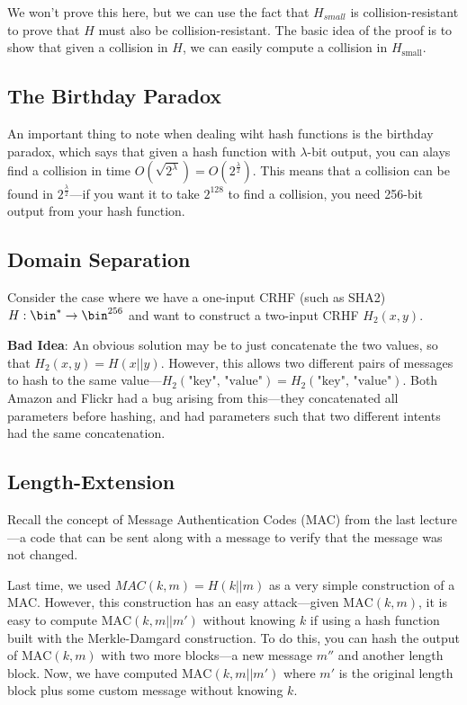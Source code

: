 We won't prove this here, but we can use the fact that $H_{small}$ is collision-resistant to prove that $H$ must also be collision-resistant. The basic idea of the proof is to show that given a collision in $H$, we can easily compute a collision in $H_{\text{small}}$. 

\subsection{The Birthday Paradox}
An important thing to note when dealing wiht hash functions is the birthday paradox, which says that given a hash function with $\lambda$-bit output, you can alays find a collision in time $O(\sqrt{2^\lambda}) = O(2^{\frac{\lambda}{2}})$. This means that a collision can be found in $2^\frac{\lambda}{2}$---if you want it to take $2^128$ to find a collision, you need 256-bit output from your hash function.

\subsection{Domain Separation}
Consider the case where we have a one-input CRHF (such as SHA2) $H: \bin^* \rightarrow \bin^{256}$ and want to construct a two-input CRHF $H_2(x, y)$. 

\textbf{Bad Idea}: An obvious solution may be to just concatenate the two values, so that $H_2(x, y) = H(x || y)$. However, this allows two different pairs of messages to hash to the same value---$H_2(\text{"key", "value"}) = H_2(\text{"key", "value"})$. Both Amazon and Flickr had a bug arising from this---they concatenated all parameters before hashing, and had parameters such that two different intents had the same concatenation.

\subsection{Length-Extension}
Recall the concept of Message Authentication Codes (MAC) from the last lecture---a code that can be sent along with a message to verify that the message was not changed.

Last time, we used $MAC(k, m) = H(k || m)$ as a very simple construction of a MAC. However, this construction has an easy attack---given $\text{MAC}(k, m)$, it is easy to compute $\text{MAC}(k, m||m')$ without knowing $k$ if using a hash function built with the Merkle-Damgard construction. To do this, you can hash the output of $\text{MAC}(k, m)$ with two more blocks---a new message $m''$ and another length block. Now, we have computed $\text{MAC}(k, m||m')$ where $m'$ is the original length block plus some custom message without knowing $k$. 

